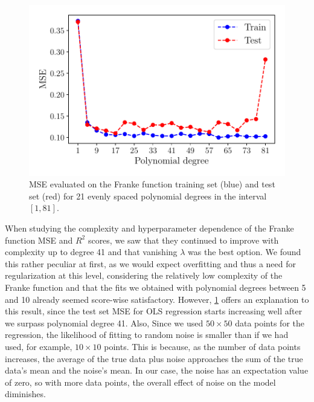 \documentclass[aps,pra,english,notitlepage,reprint,nofootinbib]{revtex4-1}  %
\begin{document}
\begin{figure}[h!]
  \vspace*{-5pt}
  \centering %
  \includegraphics[width=\columnwidth]{../figs/e_MSE_train_test.pdf}
  \caption{MSE evaluated on the Franke function training set (blue) and test set (red) for 21 evenly spaced polynomial degrees in the interval $[1, 81]$.}\label{fig:e train test}
  \vspace*{-5pt}
\end{figure}

When studying the complexity and hyperparameter dependence of the Franke function MSE and $R^2$ scores, we saw that they continued to improve with complexity up to degree 41 and that vanishing $\lambda$ was the best option. We found this rather peculiar at first, as we would expect overfitting and thus a need for regularization at this level, considering the relatively low complexity of the Franke function and that the fits we obtained with polynomial degrees between 5 and 10 already seemed score-wise satisfactory. However, \cref{fig:e train test} offers an explanation to this result, since the test set MSE for OLS regression starts increasing well after we surpass polynomial degree 41. Also, Since we used $50\times50$ data points for the regression, the likelihood of fitting to random noise is smaller than if we had used, for example, $10\times10$ points. This is because, as the number of data points increases, the average of the true data plus noise approaches the sum of the true data's mean and the noise's mean. In our case, the noise has an expectation value of zero, so with more data points, the overall effect of noise on the model diminishes. 

\vspace*{-2.5pt}
\end{document}
